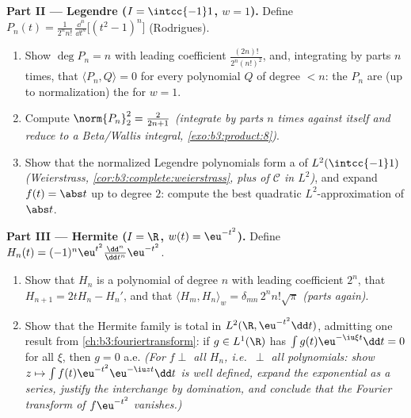 \begin{problem}
\medskip
\noindent\textbf{Part II --- Legendre ($I = \intcc{-1}1$, $w =
1$).} Define $P_n(t) = \frac{1}{2^nn!}\,\frac{\dd^n}{\dd
t^n}\bigl[(t^2 - 1)^n\bigr]$ (Rodrigues).
\begin{enumerate}[resume]
  \item Show $\deg P_n = n$ with leading coefficient
        $\frac{(2n)!}{2^n(n!)^2}$, and, integrating by parts
        $n$ times, that $\langle P_n, Q\rangle = 0$ for every
        polynomial $Q$ of degree $< n$: the $P_n$ are (up to
        normalization) the  for $w = 1$.
  \item Compute $\norm{P_n}_2^2 = \frac{2}{2n+1}$
        \emph{(integrate by parts $n$ times against itself and
        reduce to a Beta/Wallis integral,
        \cref{exo:b3:product:8})}.
  \item Show that the normalized Legendre polynomials form a
         of $L^2(\intcc{-1}1)$
        \emph{(Weierstrass, \cref{cor:b3:complete:weierstrass},
        plus  of $\mathcal C$ in $L^2$)}, and expand
        $f(t) = \abs t$ up to degree $2$: compute the best
        quadratic $L^2$-approximation of $\abs t$.
\end{enumerate}

\medskip
\noindent\textbf{Part III --- Hermite ($I = \R$, $w(t) =
\eu^{-t^2}$).} Define $H_n(t) =
(-1)^n\eu^{t^2}\frac{\dd^n}{\dd t^n}\eu^{-t^2}$.
\begin{enumerate}[resume]
  \item Show that $H_n$ is a polynomial of degree $n$ with
        leading coefficient $2^n$, that $H_{n+1} = 2tH_n -
        H_n'$, and that $\langle H_m, H_n\rangle_w =
        \delta_{mn}\,2^nn!\sqrt\pi$ \emph{(parts again)}.
  \item Show that the Hermite family is total in $L^2(\R,
        \eu^{-t^2}\dd t)$, admitting one result from
        \cref{ch:b3:fouriertransform}: if $g \in L^1(\R)$ has
        $\int g(t)\eu^{-\iu\xi t}\dd t = 0$ for all $\xi$,
        then $g = 0$ a.e. \emph{(For $f \perp$ all $H_n$,
        i.e.\ $\perp$ all polynomials: show $z \mapsto \int
        f(t)\eu^{-t^2}\eu^{-\iu zt}\dd t$ is well defined,
        expand the exponential as a series, justify the
        interchange by domination, and conclude that the
        Fourier transform of $f\eu^{-t^2}$ vanishes.)}
\end{enumerate}


\end{problem}
